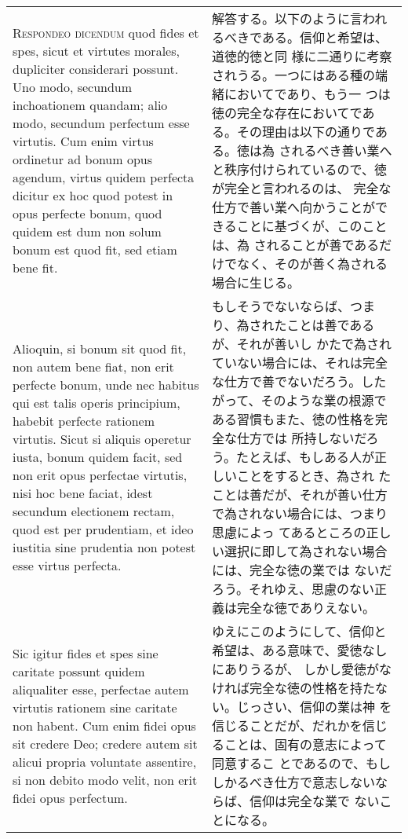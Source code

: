 \documentclass[10pt]{jsarticle}
\begin{document}
\begin{longtable}{p{21em}p{21em}}
\\


 {\scshape Respondeo dicendum} quod fides et spes, sicut et virtutes
 morales, dupliciter considerari possunt. Uno modo, secundum
 inchoationem quandam; alio modo, secundum perfectum esse
 virtutis. Cum enim virtus ordinetur ad bonum opus agendum, virtus
 quidem perfecta dicitur ex hoc quod potest in opus perfecte bonum,
 quod quidem est dum non solum bonum est quod fit, sed etiam bene fit.


&

 解答する。以下のように言われるべきである。信仰と希望は、道徳的徳と同
 様に二通りに考察されうる。一つにはある種の端緒においてであり、もう一
 つは徳の完全な存在においてである。その理由は以下の通りである。徳は為
 されるべき善い業へと秩序付けられているので、徳が完全と言われるのは、
 完全な仕方で善い業へ向かうことができることに基づくが、このことは、為
 されることが善であるだけでなく、そのが善く為される場合に生じる。

\\

 Alioquin, si bonum sit quod fit, non autem bene fiat, non erit
 perfecte bonum, unde nec habitus qui est talis operis principium,
 habebit perfecte rationem virtutis. Sicut si aliquis operetur iusta,
 bonum quidem facit, sed non erit opus perfectae virtutis, nisi hoc
 bene faciat, idest secundum electionem rectam, quod est per
 prudentiam, et ideo iustitia sine prudentia non potest esse virtus
 perfecta.


&

 もしそうでないならば、つまり、為されたことは善であるが、それが善いし
 かたで為されていない場合には、それは完全な仕方で善でないだろう。した
 がって、そのような業の根源である習慣もまた、徳の性格を完全な仕方では
 所持しないだろう。たとえば、もしある人が正しいことをするとき、為され
 たことは善だが、それが善い仕方で為されない場合には、つまり思慮によっ
 てあるところの正しい選択に即して為されない場合には、完全な徳の業では
 ないだろう。それゆえ、思慮のない正義は完全な徳でありえない。

\\

 Sic igitur fides et spes sine caritate possunt quidem aliqualiter
 esse, perfectae autem virtutis rationem sine caritate non habent. Cum
 enim fidei opus sit credere Deo; credere autem sit alicui propria
 voluntate assentire, si non debito modo velit, non erit fidei opus
 perfectum.

&

 ゆえにこのようにして、信仰と希望は、ある意味で、愛徳なしにありうるが、
 しかし愛徳がなければ完全な徳の性格を持たない。じっさい、信仰の業は神
 を信じることだが、だれかを信じることは、固有の意志によって同意するこ
 とであるので、もししかるべき仕方で意志しないならば、信仰は完全な業で
 ないことになる。


\end{longtable}
\end{document}
